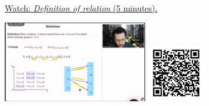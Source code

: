
\begin{minipage}{10cm}
    \href{https://act4e-spring21.netlify.app/videos/spring2021-relations:relations:rel-def.html}{Watch: \emph{Definition of relation} (5 minutes).}
        
    \href{https://act4e-spring21.netlify.app/videos/spring2021-relations:relations:rel-def.html}{\includegraphics[height=3.5cm]{spring2021-relations:relations:rel-def/thumbnails.jpg}}
    \href{https://act4e-spring21.netlify.app/videos/spring2021-relations:relations:rel-def.html}{\includegraphics[height=2.5cm]{spring2021-relations:relations:rel-def/qrcode.png}}
\end{minipage}

